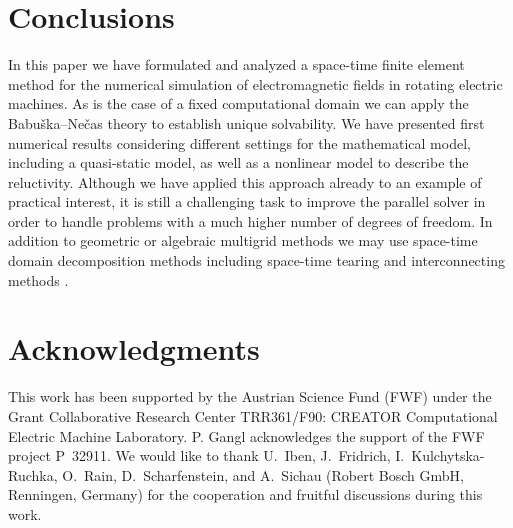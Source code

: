 \documentclass[12pt]{article}
\numberwithin{equation}{section}
\begin{document}
\section{Conclusions}
\label{sec:conclusion}
In this paper we have formulated and analyzed a space-time finite
element method for the numerical simulation of electromagnetic fields
in rotating electric machines. As is the case of a fixed computational
domain we can apply the Babu\v{s}ka--Ne\v{c}as theory to
establish unique solvability. We have presented first numerical
results considering different settings for the mathematical model,
including a quasi-static model, as well as a nonlinear model to
describe the reluctivity. Although  we have applied this approach
already to an example of practical interest, it is still a challenging
task to improve the parallel solver in order to handle problems with
a much higher number of degrees of freedom. In addition to geometric or
algebraic multigrid methods we may use space-time domain
decomposition methods \cite{SteinbachGaulhofer} including
space-time tearing and interconnecting methods 
\cite{PachecoSteinbach}. 

\section*{Acknowledgments}
This work has been supported by the Austrian
Science Fund (FWF) under the Grant Collaborative Research Center
TRR361/F90: CREATOR Computational Electric Machine Laboratory.
P. Gangl acknowledges the support of the FWF project P~32911.
We would like to thank U.~Iben, J.~Fridrich, I.~Kulchytska-Ruchka,
O.~Rain, D.~Scharfenstein, and A.~Sichau
(Robert Bosch GmbH, Renningen, Germany) for the cooperation and
fruitful discussions during this work.



\end{document}
